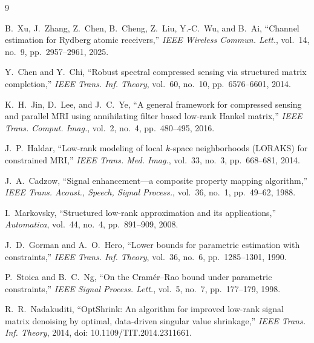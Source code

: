 \documentclass[11pt,a4paper]{article}
\begin{document}
\begin{thebibliography}{9}

B.~Xu, J.~Zhang, Z.~Chen, B.~Cheng, Z.~Liu, Y.-C.~Wu, and B.~Ai,
``Channel estimation for Rydberg atomic receivers,''
\emph{IEEE Wireless Commun. Lett.},
vol.~14, no.~9, pp.~2957--2961, 2025.

Y.~Chen and Y.~Chi,
``Robust spectral compressed sensing via structured matrix completion,''
\emph{IEEE Trans. Inf. Theory},
vol.~60, no.~10, pp.~6576--6601, 2014.

K.~H.~Jin, D.~Lee, and J.~C.~Ye,
``A general framework for compressed sensing and parallel MRI using annihilating filter based low-rank Hankel matrix,''
\emph{IEEE Trans. Comput. Imag.},
vol.~2, no.~4, pp.~480--495, 2016.

J.~P.~Haldar,
``Low-rank modeling of local $k$-space neighborhoods (LORAKS) for constrained MRI,''
\emph{IEEE Trans. Med. Imag.},
vol.~33, no.~3, pp.~668--681, 2014.

J.~A.~Cadzow,
``Signal enhancement---a composite property mapping algorithm,''
\emph{IEEE Trans. Acoust., Speech, Signal Process.},
vol.~36, no.~1, pp.~49--62, 1988.

I.~Markovsky,
``Structured low-rank approximation and its applications,''
\emph{Automatica},
vol.~44, no.~4, pp.~891--909, 2008.

J.~D.~Gorman and A.~O.~Hero,
``Lower bounds for parametric estimation with constraints,''
\emph{IEEE Trans. Inf. Theory},
vol.~36, no.~6, pp.~1285--1301, 1990.

P.~Stoica and B.~C.~Ng,
``On the Cram\'er--Rao bound under parametric constraints,''
\emph{IEEE Signal Process. Lett.},
vol.~5, no.~7, pp.~177--179, 1998.

R.~R.~Nadakuditi,
``OptShrink: An algorithm for improved low-rank signal matrix denoising by
optimal, data-driven singular value shrinkage,''
\emph{IEEE Trans. Inf. Theory}, 2014,
doi: 10.1109/TIT.2014.2311661.


\end{thebibliography}
\end{document}
